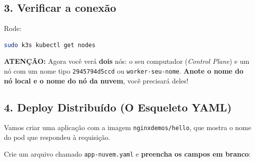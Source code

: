 \documentclass[11pt, a4paper]{article}
\begin{document}
\subsection*{3. Verificar a conexão}
Rode:

\begin{lstlisting}[language=bash]
sudo k3s kubectl get nodes
\end{lstlisting}

\begin{tcolorbox}[colback=warnbg, colframe=warnframe, arc=3pt, boxrule=0.8pt]
\textbf{ATENÇÃO:} Agora você verá \textbf{dois} nós: o seu computador (\textit{Control Plane}) e um nó com um nome tipo \texttt{2945794d5ccd} ou \texttt{worker-seu-nome}. \textbf{Anote o nome do nó local e o nome do nó da nuvem}, você precisará deles!
\end{tcolorbox}

\subsection*{4. Deploy Distribuído (O Esqueleto YAML)}
Vamos criar uma aplicação com a imagem \texttt{nginxdemos/hello}, que mostra o nome do pod que respondeu à requisição.

Crie um arquivo chamado \texttt{app-nuvem.yaml} e \textbf{preencha os campos em branco}:
\end{document}

